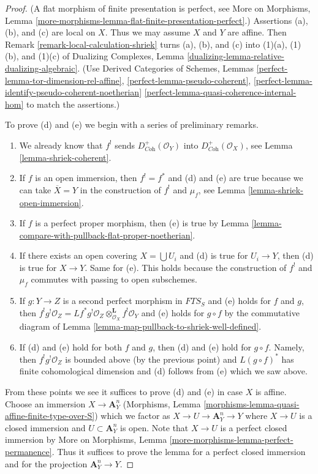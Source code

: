 \documentclass{stacks-project}
\theoremstyle{plain}
\theoremstyle{definition}
\theoremstyle{remark}
\numberwithin{equation}{subsection}
\begin{document}
\begin{proof}
(A flat morphism of finite presentation is perfect, see
More on Morphisms, Lemma
\ref{more-morphisms-lemma-flat-finite-presentation-perfect}.)
Assertions (a), (b), and (c) are local on $X$.
Thus we may assume $X$ and $Y$ are affine.
Then Remark \ref{remark-local-calculation-shriek}
turns (a), (b), and (c) into (1)(a), (1)(b), and (1)(c) of
Dualizing Complexes, Lemma \ref{dualizing-lemma-relative-dualizing-algebraic}.
(Use Derived Categories of Schemes, Lemmas
\ref{perfect-lemma-tor-dimension-rel-affine},
\ref{perfect-lemma-pseudo-coherent},
\ref{perfect-lemma-identify-pseudo-coherent-noetherian}
\ref{perfect-lemma-quasi-coherence-internal-hom} to match the assertions.)

\medskip\noindent
To prove (d) and (e) we begin with a series of preliminary remarks.
\begin{enumerate}
\item We already know that $f^!$ sends $D_{\textit{Coh}}^+(\mathcal{O}_Y)$
into $D_{\textit{Coh}}^+(\mathcal{O}_X)$, see
Lemma \ref{lemma-shriek-coherent}.
\item If $f$ is an open immersion, then $f^! = f^*$ and (d) and (e)
are true because we can take $\overline{X} = Y$ in the construction
of $f^!$ and $\mu_f$, see Lemma \ref{lemma-shriek-open-immersion}.
\item If $f$ is a perfect proper morphism, then (e) is true by
Lemma \ref{lemma-compare-with-pullback-flat-proper-noetherian}.
\item If there exists an open covering $X = \bigcup U_i$ and (d) is
true for $U_i \to Y$, then (d) is true for $X \to Y$. Same for (e).
This holds because the construction of $f^!$ and $\mu_f$ commutes
with passing to open subschemes.
\item If $g : Y \to Z$ is a second perfect morphism in $\textit{FTS}_S$
and (e) holds for $f$ and $g$, then
$f^!g^!\mathcal{O}_Z =
Lf^*g^!\mathcal{O}_Z \otimes_{\mathcal{O}_X}^\mathbf{L} f^!\mathcal{O}_Y$
and (e) holds for $g \circ f$ by the commutative diagram
of Lemma \ref{lemma-map-pullback-to-shriek-well-defined}.
\item If (d) and (e) hold for both $f$ and $g$, then
(d) and (e) hold for $g \circ f$. Namely, then $f^!g^!\mathcal{O}_Z$
is bounded above (by the previous point) and $L(g \circ f)^*$ has finite
cohomological dimension and (d) follows from (e) which we saw above.
\end{enumerate}
From these points we see it suffices to prove (d) and (e) in case $X$ is
affine. Choose an immersion $X \to \mathbf{A}^n_Y$
(Morphisms, Lemma \ref{morphisms-lemma-quasi-affine-finite-type-over-S})
which we factor as $X \to U \to \mathbf{A}^n_Y \to Y$ where $X \to U$
is a closed immersion and $U \subset \mathbf{A}^n_Y$ is open.
Note that $X \to U$ is a perfect closed immersion by
More on Morphisms, Lemma \ref{more-morphisms-lemma-perfect-permanence}.
Thus it suffices to prove the lemma for a perfect closed immersion
and for the projection $\mathbf{A}^n_Y \to Y$.


\end{proof}
\end{document}
